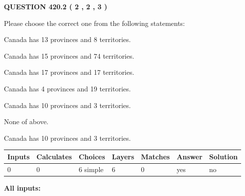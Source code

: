 \documentclass[12pt]{article}
\begin{document}
   
  
\vspace{0.2in}
  
{\textbf{\Large{QUESTION
420.2 
 ( 2 , 2 , 3 )
}}}
  
  
Please choose the correct one from the following statements:
 
 
Canada has  13 provinces and  8 territories.
 
 
Canada has  15 provinces and  74 territories.
 
 
Canada has  17 provinces and  17 territories.
 
 
Canada has   4 provinces and  19 territories.
 
 
Canada has 10  provinces and 3 territories.
 
 
 None of above.
 
 
\noindent{}
 
 
Canada has 10  provinces and 3 territories.
 
 
\noindent{}
 
 
   
   
   
   
\noindent\begin{tabular}{|l|l|l|l|l|l|l|}
 \hline
Inputs & Calculates & Choices & Layers & Matches & Answer & Solution \\ \hline
 0  & 
 0  & 
 6
  simple  
  & 
 6  & 
 0  & 
  yes & 
  no 
  \\ \hline
 \end{tabular}
   
   
   
   
\noindent{}
   
   
   
   
\noindent\vspace{0.1in}\hspace{-0.08in} {\textbf{\Large{All inputs: }}}
   
   
   
   
   
   
 \vspace{0.2in}
 
\end{document}
